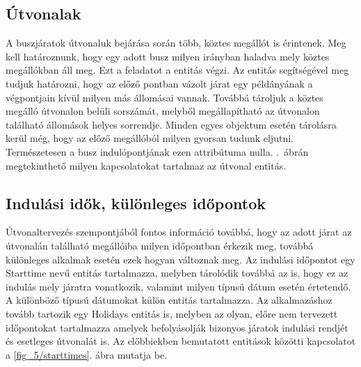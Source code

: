 \subsection*{Útvonalak}
\label{linehasstationsdetails}
A buszjáratok útvonaluk bejárása során több, köztes megállót is érintenek. 
Meg kell határoznunk, hogy egy adott busz milyen irányban haladva mely köztes megállókban áll meg. 
Ezt a feladatot a  entitás végzi. 
Az entitás segítségével meg tudjuk határozni, hogy az előző pontban vázolt járat egy példányának a végpontjain kívül milyen más állomásai vannak. 
Továbbá tároljuk a köztes megálló útvonalon belüli sorszámát, melyből megállapítható az útvonalon található állomások helyes sorrendje. 
Minden egyes objektum esetén tárolásra kerül még, hogy az előző megállóból milyen gyorsan tudunk eljutni. 
Természetesen a busz indulópontjának ezen attribútuma nulla. 
.\ ábrán megtekinthető milyen kapcsolatokat tartalmaz az útvonal entitás. 
\subsection*{Indulási idők, különleges időpontok}
\label{starttimes}
Útvonaltervezés szempontjából fontos információ továbbá, hogy az adott járat az útvonalán található megállóiba milyen időpontban érkezik meg, továbbá különleges alkalmak esetén ezek hogyan változnak meg. 
Az indulási időpontot egy Starttime nevű entitás tartalmazza, melyben tárolódik továbbá az is, hogy ez az indulás mely járatra vonatkozik, valamint milyen típusú dátum esetén értetendő. 
A különböző típusú dátumokat külön entitás tartalmazza. 
Az alkalmazáshoz tovább tartozik egy Holidays entitás is, melyben az olyan, előre nem tervezett időpontokat tartalmazza amelyek befolyásolják bizonyos járatok indulási rendjét és esetleges útvonalát is. 
Az előbbiekben bemutatott entitások közötti kapcsolatot a \ref{fig_5/starttimes}. ábra mutatja be. 

